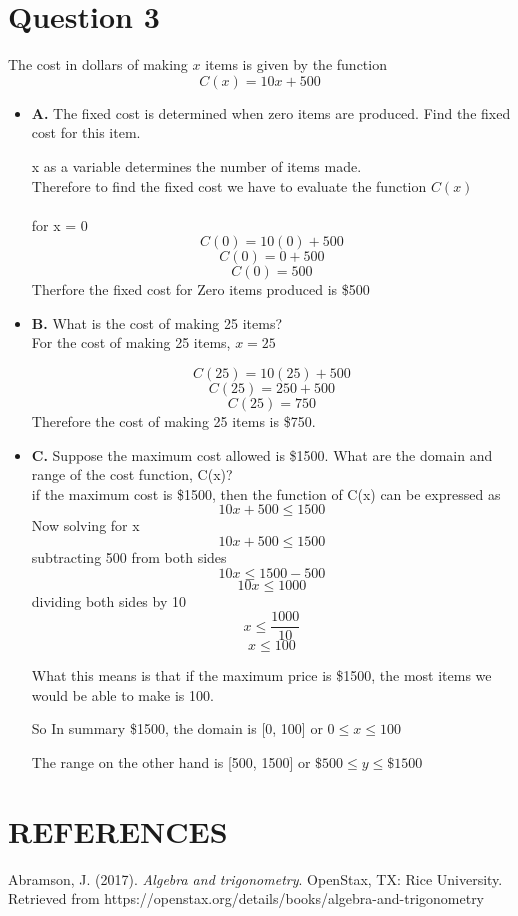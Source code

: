 \documentclass{article}
\begin{document}
\section*{Question 3}
The cost in dollars of making ${x}$ items is given by the function 
$${C(x) = 10x + 500}$$
\begin{itemize}
    \item \textbf{A.}  The fixed cost is determined when zero items are produced. Find the fixed cost for this item.
    
    x as a  variable determines the number of items made.\\
    Therefore to find the fixed cost we have to evaluate the function ${C(x)}$
\\\\
    for x = 0
    $${C(0) = 10(0) + 500}$$
    $${C(0) = 0 + 500}$$
    $${C(0) = 500}$$
    Therfore the fixed cost for Zero items produced is \$500
    

    \item \textbf{B.}  What is the cost of making 25 items?\\
    For the cost of making 25 items, ${x = 25}$
    
    $${C(25) = 10(25) + 500}$$
    $${C(25) = 250 + 500}$$
    $${C(25) = 750}$$
    Therefore the cost of making 25 items is \$750.
    
    \item \textbf{C.}  Suppose the maximum cost allowed is \$1500. What are the domain and range of the cost function, C(x)?\\
    if the maximum cost is \$1500, then the function of C(x) can be expressed as
    $${10x + 500 \le 1500}$$
    Now solving for x
    $${10x + 500 \le 1500}$$
    subtracting 500 from both sides
    $${10x \le 1500 - 500}$$
    $${10x \le 1000}$$
    dividing both sides by 10
    $${ x \le \frac{1000}{10}}$$
    $${ x \le 100}$$

    What this means is that if the maximum price is \$1500, the most items we would be able to make is 100.

    So In summary \$1500, the domain is [0, 100] or ${0 \le x \le 100}$

    The range on the other hand is [500, 1500] or ${ \$500 \le y \le \$1500}$ 


\end{itemize}





\section*{REFERENCES}
Abramson, J. (2017). \textit{Algebra and trigonometry}. OpenStax, TX: Rice University. Retrieved
from https://openstax.org/details/books/algebra-and-trigonometry
\end{document}

